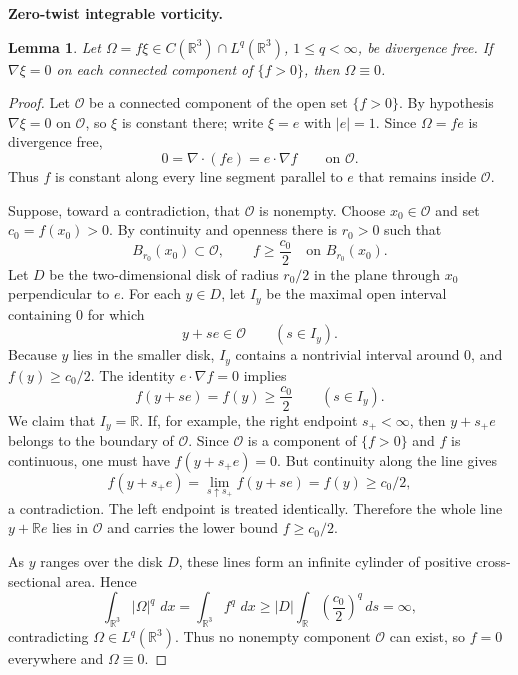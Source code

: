 \documentclass[11pt]{article}
\newtheorem{lemma}[theorem]{Lemma}
\theoremstyle{definition}\newtheorem{definition}[theorem]{Definition}
\theoremstyle{remark}\newtheorem{remark}[theorem]{Remark}
\newcommand{\R}{\mathbb R}\newcommand{\dd}{\,d}\newcommand{\HH}{\mathcal H}
\begin{document}
\medskip
\noindent\textbf{Zero-twist integrable vorticity.}
\begin{lemma}\label{lem:zerotwist}
Let $\Omega=f\xi\in C(\R^3)\cap L^q(\R^3)$, $1\le q<\infty$, be divergence free. If $\nabla\xi=0$ on each connected component of $\{f>0\}$, then $\Omega\equiv0$.
\end{lemma}
\begin{proof}
Let $\mathcal O$ be a connected component of the open set $\{f>0\}$.  By
hypothesis $\nabla\xi=0$ on $\mathcal O$, so $\xi$ is constant there; write
$\xi=e$ with $|e|=1$.  Since $\Omega=fe$ is divergence free,
\[
0=\nabla\cdot(fe)=e\cdot\nabla f
\qquad\text{on }\mathcal O.
\]
Thus $f$ is constant along every line segment parallel to $e$ that remains
inside $\mathcal O$.

Suppose, toward a contradiction, that $\mathcal O$ is nonempty.  Choose
$x_0\in\mathcal O$ and set $c_0=f(x_0)>0$.  By continuity and openness there
is $r_0>0$ such that
\[
B_{r_0}(x_0)\subset\mathcal O,
\qquad
f\ge\frac{c_0}{2}
\quad\text{on }B_{r_0}(x_0).
\]
Let $D$ be the two-dimensional disk of radius $r_0/2$ in the plane through
$x_0$ perpendicular to $e$.  For each $y\in D$, let $I_y$ be the maximal
open interval containing $0$ for which
\[
y+se\in\mathcal O\qquad(s\in I_y).
\]
Because $y$ lies in the smaller disk, $I_y$ contains a nontrivial interval
around $0$, and $f(y)\ge c_0/2$.  The identity $e\cdot\nabla f=0$ implies
\[
f(y+se)=f(y)\ge\frac{c_0}{2}
\qquad(s\in I_y).
\]
We claim that $I_y=\R$.  If, for example, the right endpoint $s_+<\infty$,
then $y+s_+e$ belongs to the boundary of $\mathcal O$.  Since
$\mathcal O$ is a component of $\{f>0\}$ and $f$ is continuous, one must have
$f(y+s_+e)=0$.  But continuity along the line gives
\[
f(y+s_+e)=\lim_{s\uparrow s_+}f(y+se)=f(y)\ge c_0/2,
\]
a contradiction.  The left endpoint is treated identically.  Therefore the
whole line $y+\R e$ lies in $\mathcal O$ and carries the lower bound
$f\ge c_0/2$.

As $y$ ranges over the disk $D$, these lines form an infinite cylinder of
positive cross-sectional area.  Hence
\[
\int_{\R^3}|\Omega|^q\,\dd x
=\int_{\R^3}f^q\,\dd x
\ge |D|\int_{\R}\left(\frac{c_0}{2}\right)^q\dd s
=\infty,
\]
contradicting $\Omega\in L^q(\R^3)$.  Thus no nonempty component
$\mathcal O$ can exist, so $f=0$ everywhere and $\Omega\equiv0$.
\end{proof}
\end{document}
